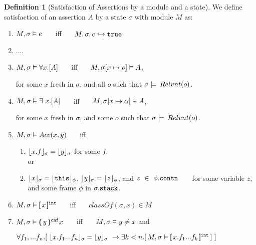 \documentclass[11pt]{article} %
\theoremstyle{definition}
\newtheorem{definition}{Definition}[section]
\begin{document}
\begin{definition}[Satisfaction %
of Assertions by a module and a state] 
\label{def:chainmail-semantics}
We define satisfaction of an assertion $A$ by a %
state $\sigma$ with 
 module $M$ as:
\begin{enumerate}
\addtolength\itemsep{-3mm}
\item
\label{cExpr}
$M , \sigma \vDash e$ \ \ \ iff \ \ \  $M, \sigma, e \hookrightarrow \texttt{true}$
\item
....
\item
\label{quant1}
$M , \sigma \vDash \forall x.[A]$ \ \ \ iff \ \ \  
$M , \sigma[x \mapsto o] \vDash A$, \\
\strut \hspace{1.3in}   for some $x$ fresh in $\sigma$, and all  $o$ such that $\sigma \models \,Relvnt(o)$.
\item
\label{quant2}
$M , \sigma \vDash \exists\ x.[A]$ \ \ \ iff \ \ \  
$M , \sigma[x \mapsto \alpha] \vDash A$, \\
\strut \hspace{1.3in}   for some $x$ fresh in $\sigma$, and some $o$ such that $\sigma \models \,Relvnt(o)$.
\item
\label{cAccess}
$M , \sigma \vDash Acc(x,y)$ \ \ \ iff \ \ \  
\begin{enumerate}
\item
\label{c1}
$\lfloor x.f \rfloor_{\sigma}={\lfloor y \rfloor_{\sigma}}$ for some $f$, \\
  or
\item
\label{c2}
{$\lfloor x \rfloor_{\sigma}=\lfloor {\texttt{this}} \rfloor_{\phi}$}, {$\lfloor y \rfloor_{\sigma}=\lfloor z \rfloor_{\phi}$}, and $z\ \in\ \phi.{\texttt{contn}}$\ \ \ \
for some variable $z$, and some frame $\phi$ in $\sigma.
{\texttt{stack}}$.
\end{enumerate}
\item
\label{cInternal}
$M , \sigma \vDash [\!\![ \,x\, ]\!\!]^{{\texttt{int}}}$ \ \ \ iff \ \ \  
$\textit{classOf}(\sigma,x) \in M$
\item
\label{cProtected}
$M , \sigma \vDash (\!\!(\, y\, )\!\!)^{{\texttt{cnf}}} x$  \ \ \ iff \ \ \   $M , \sigma \vDash y \neq x$  and \\
\strut \hspace{1.3in} $\forall f_1,...f_n.[\ \interpret{\sigma}{x.f_1...f_n}=\interpret{\sigma}{y} \ \rightarrow \exists k<n. 
[\,\satisfiesA{M}{\sigma}{\internal{x.f_1...f_k}} \, ] \ ]$
\end{enumerate}
\end{definition}
\end{document}
